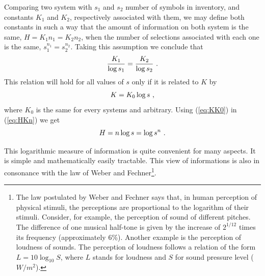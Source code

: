 Comparing two system with $s_1$ and $s_2$ number of symbols in inventory, and constants $K_1$ and $K_2$, 
respectively associated with them, we may define both constants in such a way that the amount of information on 
both system is the same, $H=K_1 n_1 = K_2 n_2$, when the number of selections associated with each one is the same,
$s_1^{n_1} = s_2^{n_2}$. Taking this assumption we conclude that
\begin{equation}
\frac{K_1}{\log s_1} = \frac{K_2}{\log s_2} \textmd{ .}
\end{equation}
This relation will hold for all values of $s$ only if it is related to $K$ by 
\begin{equation}
K = K_0 \log s \textmd{ ,}
\label{eq:KK0}
\end{equation}
where $K_0$ is the same for every systems and arbitrary. Using (\ref{eq:KK0}) in (\ref{eq:HKn}) we get
\begin{equation}
H = n \log s = \log s^n \textmd{ .}
\end{equation}

This logarithmic measure of information is quite convenient for many aspects. 
It is simple and mathematically easily tractable. This view of informations is also in consonance with 
the law of Weber and Fechner\footnote{The law postulated by Weber and Fechner says that, in human perception 
of physical stimuli, the perceptions are proportional to the logarithm of their stimuli. Consider, for example, 
the perception of sound of different pitches. The difference of one musical half-tone is given by the increase 
of $2^{1/12}$ times its frequency (approximately 6\%). Another example is the perception of loudness of sounds. 
The perception of loudness follows a relation of the form $L = 10 \log_{10} S$, where $L$ stands for loudness 
and $S$ for sound pressure level ($W/m^2$).}. 

